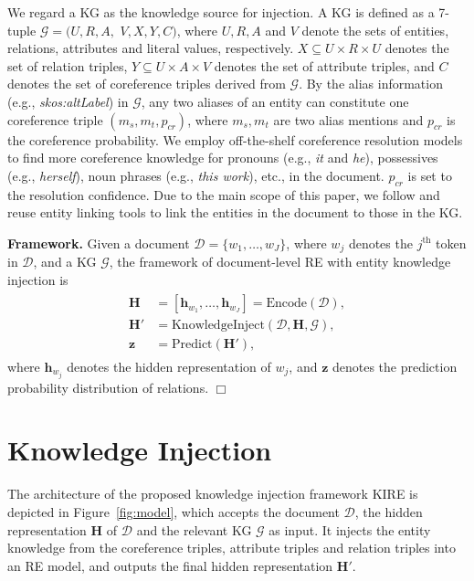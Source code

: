 \documentclass[runningheads]{llncs}
\begin{document}
We regard a KG as the knowledge source for injection.
A KG is defined as a 7-tuple $\mathcal{G}=(U,R,A,$ $V,X,Y,C)$, where $U,R,A$ and $V$ denote the sets of entities, relations, attributes and literal values, respectively. $X \subseteq U \times R \times U$ denotes the set of relation triples, $Y \subseteq U \times A \times V$ denotes the set of attribute triples, and $C$ denotes the set of coreference triples derived from $\mathcal{G}$.
By the alias information (e.g., \textit{skos:altLabel}) in $\mathcal{G}$, any two aliases of an entity can constitute one coreference triple $(m_s,m_t,p_{cr})$, where $m_s,m_t$ are two alias mentions and $p_{cr}$ is the coreference probability.
We employ off-the-shelf coreference resolution models to find more coreference knowledge for pronouns (e.g., \textit{it} and \textit{he}), possessives (e.g., \textit{herself}), noun phrases (e.g., \textit{this work}), etc., in the document.
$p_{cr}$ is set to the resolution confidence.
Due to the main scope of this paper, we follow \cite{liu2020kbert,zhang2019ernie} and reuse entity linking tools to link the entities in the document to those in the KG. 

\textbf{Framework.}
Given a document $\mathcal{D}=\{w_1,\dots,w_J\}$, where $w_j$ denotes the $j^\text{th}$ token in $\mathcal{D}$, and a KG $\mathcal{G}$, the framework of document-level RE with entity knowledge injection is
\begin{align}
	\begin{aligned}
		\mathbf{H} &= [\mathbf{h}_{w_1},\dots,\mathbf{h}_{w_J}] = \mathrm{Encode}(\mathcal{D}), \\
		\mathbf{H}' &= \mathrm{KnowledgeInject}(\mathcal{D},\mathbf{H},\mathcal{G}), \\
		\mathbf{z} &= \mathrm{Predict}(\mathbf{H}'),
	\end{aligned}
\end{align}
where $\mathbf{h}_{w_j}$ denotes the hidden representation of $w_j$, and $\mathbf{z}$ denotes the prediction probability distribution of relations. \hfill $\Box$


\section{Knowledge Injection}
\label{sect:model}

The architecture of the proposed knowledge injection framework KIRE is depicted in Figure~\ref{fig:model}, which accepts the document $\mathcal{D}$, the hidden representation $\mathbf{H}$ of $\mathcal{D}$ and the relevant KG $\mathcal{G}$ as input. 
It injects the entity knowledge from the coreference triples, attribute triples and relation triples into an RE model, and outputs the final hidden representation $\mathbf{H}'$. 
\end{document}
